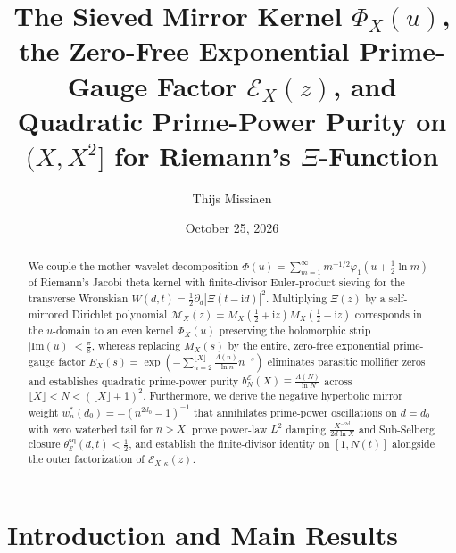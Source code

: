 \documentclass[11pt,reqno]{amsart}
\title[Sieved Mirror Kernel and Prime-Gauge Purity]{The Sieved Mirror Kernel $\Phi_X(u)$, the Zero-Free Exponential Prime-Gauge Factor $\mathcal{E}_X(z)$, and Quadratic Prime-Power Purity on $(X, X^2]$ for Riemann's $\Xi$-Function}
\author{Thijs Missiaen}
\date{October 25, 2026}
\theoremstyle{definition}
\theoremstyle{remark}
\numberwithin{equation}{section}
\newcommand{\ii}{\mathrm{i}}
\newcommand{\Ima}{\mathrm{Im}}
\begin{document}
\sloppy

\begin{abstract}
We couple the mother-wavelet decomposition $\Phi(u) = \sum_{m=1}^{\infty} m^{-1/2}\varphi_1(u + \frac{1}{2}\ln m)$ of Riemann's Jacobi theta kernel with finite-divisor Euler-product sieving for the transverse Wronskian $W(d,t) = \frac{1}{2}\partial_d|\Xi(t - \ii d)|^2$. Multiplying $\Xi(z)$ by a self-mirrored Dirichlet polynomial $\mathcal{M}_X(z) = M_X(\frac{1}{2}+\ii z)M_X(\frac{1}{2}-\ii z)$ corresponds in the $u$-domain to an even kernel $\Phi_X(u)$ preserving the holomorphic strip $|\Ima(u)| < \frac{\pi}{8}$, whereas replacing $M_X(s)$ by the entire, zero-free exponential prime-gauge factor $E_X(s) = \exp(-\sum_{n=2}^{\lfloor X\rfloor} \frac{\Lambda(n)}{\ln n}n^{-s})$ eliminates parasitic mollifier zeros and establishes quadratic prime-power purity $b_N^{\mathcal{E}}(X) \equiv \frac{\Lambda(N)}{\ln N}$ across $\lfloor X\rfloor < N < (\lfloor X\rfloor + 1)^2$. Furthermore, we derive the negative hyperbolic mirror weight $w_n^*(d_0) = -(n^{2d_0}-1)^{-1}$ that annihilates prime-power oscillations on $d = d_0$ with zero waterbed tail for $n > X$, prove power-law $L^2$ damping $\frac{X^{-2d}}{2d\ln X}$ and Sub-Selberg closure $\theta_{\mathcal{E}}^{\mathrm{sq}}(d,t) < \frac{1}{2}$, and establish the finite-divisor identity on $[1, N(t)]$ alongside the outer factorization of $\mathcal{E}_{X,\kappa}(z)$.
\end{abstract}

\maketitle

\section{Introduction and Main Results}\label{sec:intro}
\end{document}
